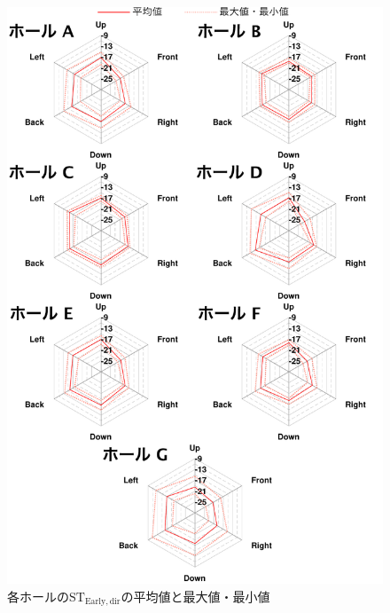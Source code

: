 \documentclass[11pt,a4j]{jreport}
\begin{document}
\newpage
{}
\begin{figure}[H]
  \centering
  \includegraphics[scale=.8]{images/realHallDirSt/realHallOverall/eachHallEarly.pdf}
  \caption{各ホールの$\mathrm{ST_{Early,dir}}$の平均値と最大値・最小値}
  \label{fig:各ホールのSTEarlyの平均値と最大値・最小値}
\end{figure}

\end{document}
